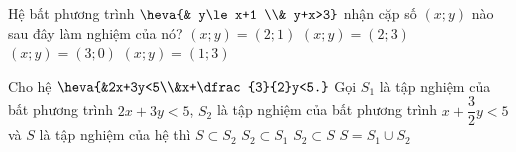 \begin{ex}%
	Hệ bất phương trình $\heva{& y\le x+1 \\& y+x>3}$ nhận cặp số $(x;y)$ nào sau đây làm nghiệm của nó?
	\choice
	{$(x;y)=(2;1)$}
	{\True $(x;y)=(2;3)$}
	{$(x;y)=(3;0)$}
	{$(x;y)=(1;3)$}
\end{ex}

\begin{ex}%
	Cho hệ $\heva{&2x+3y<5\\&x+\dfrac{3}{2}y<5.}$  Gọi $S_1$ là tập nghiệm của bất phương trình $2x+3y<5$, $S_2$ là tập nghiệm của bất phương trình $x+\dfrac{3}{2}y<5$ và $S$ là tập nghiệm của hệ thì
	\choice
	{\True $S \subset S_2$}
	{$S_2\subset S_1 $}
	{$S_2\subset S $}
	{$S=S_1 \cup S_2$}
\end{ex}

